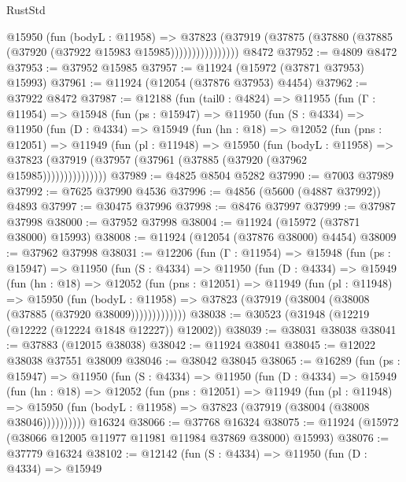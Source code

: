 \begin{lexlean}{RustStd}
\begin{coremodule}
                    @15950
                      (fun (bodyL : @11958) =>
                      @37823
                        (@37919
                          (@37875 (@37880 (@37885 (@37920 (@37922 @15983 @15985))))))))))))))))
    @8472
@37952 := @4809 @8472
@37953 := @37952 @15985
@37957 := @11924 (@15972 (@37871 @37953) @15993)
@37961 := @11924 (@12054 (@37876 @37953) @4454)
@37962 := @37922 @8472
@37987 := @12188
    (fun (tail0 : @4824) =>
    @11955
      (fun (Γ : @11954) =>
      @15948
        (fun (ps : @15947) =>
        @11950
          (fun (S : @4334) =>
          @11950
            (fun (D : @4334) =>
            @15949
              (fun (hn : @18) =>
              @12052
                (fun (pns : @12051) =>
                @11949
                  (fun (pl : @11948) =>
                  @15950
                    (fun (bodyL : @11958) =>
                    @37823 (@37919 (@37957 (@37961 (@37885 (@37920 (@37962 @15985)))))))))))))))
@37989 := @4825 @8504 @5282
@37990 := @7003 @37989
@37992 := @7625 @37990 @4536
@37996 := @4856 (@5600 (@4887 @37992)) @4893
@37997 := @30475 @37996
@37998 := @8476 @37997
@37999 := @37987 @37998
@38000 := @37952 @37998
@38004 := @11924 (@15972 (@37871 @38000) @15993)
@38008 := @11924 (@12054 (@37876 @38000) @4454)
@38009 := @37962 @37998
@38031 := @12206
    (fun (Γ : @11954) =>
    @15948
      (fun (ps : @15947) =>
      @11950
        (fun (S : @4334) =>
        @11950
          (fun (D : @4334) =>
          @15949
            (fun (hn : @18) =>
            @12052
              (fun (pns : @12051) =>
              @11949
                (fun (pl : @11948) =>
                @15950
                  (fun (bodyL : @11958) =>
                  @37823 (@37919 (@38004 (@38008 (@37885 (@37920 @38009)))))))))))))
@38038 := @30523 (@31948 (@12219 (@12222 (@12224 @1848 @12227)) @12002))
@38039 := @38031 @38038
@38041 := @37883 (@12015 @38038)
@38042 := @11924 @38041
@38045 := @12022 @38038 @37551 @38009
@38046 := @38042 @38045
@38065 := @16289
    (fun (ps : @15947) =>
    @11950
      (fun (S : @4334) =>
      @11950
        (fun (D : @4334) =>
        @15949
          (fun (hn : @18) =>
          @12052
            (fun (pns : @12051) =>
            @11949
              (fun (pl : @11948) =>
              @15950 (fun (bodyL : @11958) => @37823 (@37919 (@38004 (@38008 @38046))))))))))
    @16324
@38066 := @37768 @16324
@38075 := @11924 (@15972 (@38066 @12005 @11977 @11981 @11984 @37869 @38000) @15993)
@38076 := @37779 @16324
@38102 := @12142
    (fun (S : @4334) =>
    @11950
      (fun (D : @4334) =>
      @15949

\end{coremodule}
\end{lexlean}
